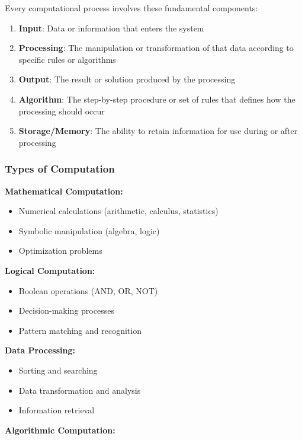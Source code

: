 Every computational process involves these fundamental components:

\begin{enumerate}
\item \textbf{Input}: Data or information that enters the system
\item \textbf{Processing}: The manipulation or transformation of that data according to specific rules or algorithms
\item \textbf{Output}: The result or solution produced by the processing
\item \textbf{Algorithm}: The step-by-step procedure or set of rules that defines how the processing should occur
\item \textbf{Storage/Memory}: The ability to retain information for use during or after processing
\end{enumerate}

\subsubsection{Types of Computation}

\textbf{Mathematical Computation:}

\begin{itemize}
\item Numerical calculations (arithmetic, calculus, statistics)
\item Symbolic manipulation (algebra, logic)
\item Optimization problems
\end{itemize}

\textbf{Logical Computation:}

\begin{itemize}
\item Boolean operations (AND, OR, NOT)
\item Decision-making processes
\item Pattern matching and recognition
\end{itemize}

\textbf{Data Processing:}

\begin{itemize}
\item Sorting and searching
\item Data transformation and analysis
\item Information retrieval
\end{itemize}

\textbf{Algorithmic Computation:}

